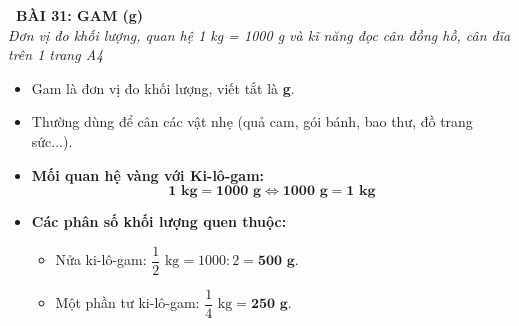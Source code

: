 \documentclass[11pt,a4paper]{article}
\begin{document}
\begin{tcolorbox}[
  enhanced,
  colback=white,
  colframe=primary,
  arc=3mm,
  boxrule=1.2pt,
  left=4mm, right=4mm, top=2.5mm, bottom=2.5mm,
  drop shadow=black!10!white
]
  \centering
  {\Large\bfseries\color{primary}\faBookmark\ BÀI 31: GAM (g)}\\[1.5mm]
  {\small\itshape\color{black!75}Đơn vị đo khối lượng, quan hệ 1 kg = 1000 g và kĩ năng đọc cân đồng hồ, cân đĩa trên 1 trang A4}
\end{tcolorbox}

\vspace{-2mm}


\noindent
\begin{minipage}[t]{0.49\textwidth}\vspace{0pt}
\begin{tcolorbox}[
  enhanced,
  colback=blue!4!white,
  colframe=blue!75!black,
  arc=2mm, boxrule=0.8pt,
  left=2mm, right=2mm, top=1.8mm, bottom=1.8mm,
  title={\footnotesize\bfseries\color{white}\faKey\ 1. Đơn vị Gam (g)}
]
{\footnotesize
\begin{itemize}\setlength{\itemsep}{1.5pt}\setlength{\leftskip}{-2.5mm}
  \item Gam là đơn vị đo khối lượng, viết tắt là \textbf{g}.
  \item Thường dùng để cân các vật nhẹ (quả cam, gói bánh, bao thư, đồ trang sức...).
  \item \textbf{Mối quan hệ vàng với Ki-lô-gam:}
  $$\mathbf{1\text{ kg} = 1000\text{ g}} \iff \mathbf{1000\text{ g} = 1\text{ kg}}$$
  \item \textbf{Các phân số khối lượng quen thuộc:}
  \begin{itemize}\setlength{\itemsep}{0.5pt}\setlength{\leftskip}{-2.5mm}
    \item Nửa ki-lô-gam: $\dfrac{1}{2}\text{ kg} = 1000 : 2 = \mathbf{500\text{ g}}$.
    \item Một phần tư ki-lô-gam: $\dfrac{1}{4}\text{ kg} = \mathbf{250\text{ g}}$.
  \end{itemize}
\end{itemize}
}
\end{tcolorbox}
\end{minipage}
\hfill
\end{document}
